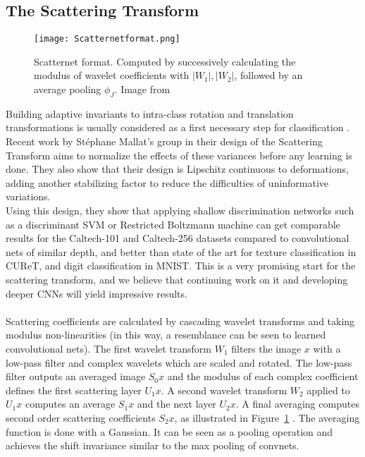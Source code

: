 \documentclass[12pt, a4paper, oneside, english]{article}
\begin{document}
\subsection{The Scattering Transform}
\begin{figure}
\centering
\texttt{[image: Scatternetformat.png]}
\caption{Scatternet format. Computed by successively calculating the modulus of wavelet coefficients with $|W_1|, |W_2|$, followed by an average pooling $\phi_J$. Image from \cite{oyallon_generic_2013}}
\label{ScatterNetFormat}
\end{figure}
Building adaptive invariants to intra-class rotation and translation transformations is usually considered as a first necessary step for classification \cite{poggio_computational_2012}. Recent work by St\'{e}phane Mallat's group in their design of the Scattering Transform \cite{sifre_rotation_2013, sifre_rigid-motion_2014} aims to normalize the effects of these variances before any learning is done. They also show that their design is Lipschitz continuous to deformations, adding another stabilizing factor to reduce the difficulties of uninformative variations. \\
Using this design, they show \cite{bruna_invariant_2013, oyallon_generic_2013} that applying shallow discrimination networks such as a discriminant SVM or Restricted Boltzmann machine can get comparable results for the Caltech-101 and Caltech-256 datasets compared to convolutional nets of similar depth, and better than state of the art for texture classification in CUReT, and digit classification in MNIST. This is a very promising start for the scattering transform, and we believe that continuing work on it and developing deeper CNNs will yield impressive results.\\\\
Scattering coefficients are calculated by cascading wavelet transforms and taking modulus non-linearities (in this way, a resemblance can be seen to learned convolutional nets). The first wavelet transform $W_1$ filters the image $x$ with a low-pass filter and complex wavelets which are scaled and rotated. The low-pass filter outputs an averaged image $S_{0}x$ and the modulus of each complex coefficient defines the first scattering layer $U_{1}x$. A second wavelet transform $W_2$ applied to $U_{1}x$ computes an average $S_{1}x$ and the next layer $U_{2}x$. A final averaging computes second order scattering coefficients $S_{2}x$, as illustrated in Figure~\ref{ScatterNetFormat} \cite{oyallon_generic_2013}. The averaging function is done with a Gaussian. It can be seen as a pooling operation and achieves the shift invariance similar to the max pooling of convnets. \\\\
\end{document}
